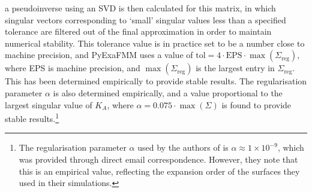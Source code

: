a pseudoinverse using an \gls{SVD} is then calculated for this matrix, in which
singular vectors corresponding to `small' singular values less than a specified
tolerance are filtered out of the final approximation in order to maintain
numerical stability. This tolerance value is in practice set to be a number close
to machine precision, and \gls{PyExaFMM} uses a value of $\text{tol} = 4 \cdot \text{EPS} \cdot \max (\Sigma_{\text{reg}})$,
where EPS is machine precision, and $\max (\Sigma_{\text{reg}})$ is the largest
entry in $\Sigma_{\text{reg}}$. This has been determined empirically to provide
stable results. The regularisation parameter $\alpha$ is also determined empirically,
and a value proportional to the largest singular value of $K_A$, where
$\alpha=0.075 \cdot \max(\Sigma)$ is found to provide stable results.\footnote{
    The regularisation parameter $\alpha$ used by the authors of \cite{Malhotra:2015:CCP}
    is $\alpha \approx  1 \times 10^{-9}$, which was provided through direct email correspondence. However,
    they note that this is an empirical value, reflecting the expansion order of
    the surfaces they used in their simulations.
}

